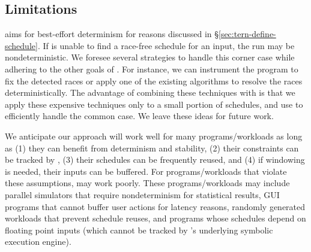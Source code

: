 
\subsection{Limitations} \label{sec:tern-limit}


 \tern aims for best-effort determinism for reasons
discussed in \S\ref{sec:tern-define-schedule}.  If \tern is unable to find a
race-free schedule for an input, the run may be nondeterministic.  We
foresee several strategies to handle this corner case while adhering to
the other goals of \tern.  For instance, we can instrument the program to
fix the detected races or apply one of the existing \dmt algorithms to
resolve the races deterministically.  The advantage of combining these
techniques with \tern is that we apply these expensive techniques only to a
small portion of schedules, and use \tern to efficiently handle the common
case.  We leave these ideas for future work.


 We anticipate our approach will work well for many
programs/workloads as long as (1) they can benefit from determinism and
stability, (2) their constraints can be tracked by \tern, (3) their
schedules can be frequently reused, and (4) if windowing is needed, their
inputs can be buffered.  For programs/workloads that
violate these assumptions, \tern may work poorly.  These programs/workloads
may include parallel simulators that require nondeterminism for
statistical results, GUI programs that cannot buffer user actions for
latency reasons, randomly generated workloads that prevent schedule
reuses, and programs whose schedules depend on floating point inputs
(which cannot be tracked by \tern's underlying symbolic execution engine).

